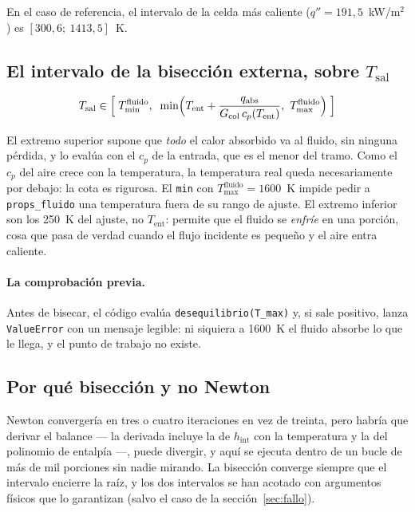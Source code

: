 \documentclass[11pt,a4paper]{article}
\begin{document}
En el caso de referencia, el intervalo de la celda más caliente
($q'' = 191{,}5$~kW/m$^2$) es $[300{,}6;\ 1413{,}5]$~K.

\subsection{El intervalo de la bisección externa, sobre $T_{\mathrm{sal}}$}

\[
  T_{\mathrm{sal}} \in \Bigl[\;T_{\min}^{\mathrm{fluido}},\;\;
  \min\Bigl(T_{\mathrm{ent}} + \frac{q_{\mathrm{abs}}}{G_{\mathrm{col}}\,c_p(T_{\mathrm{ent}})},\ T_{\max}^{\mathrm{fluido}}\Bigr)\;\Bigr]
\]

El extremo superior supone que \emph{todo} el calor absorbido va al fluido, sin
ninguna pérdida, y lo evalúa con el $c_p$ de la entrada, que es el menor del
tramo. Como el $c_p$ del aire crece con la temperatura, la temperatura real
queda necesariamente por debajo: la cota es rigurosa. El \texttt{min} con
$T_{\max}^{\mathrm{fluido}} = 1600$~K impide pedir a \texttt{props\_fluido} una
temperatura fuera de su rango de ajuste. El extremo inferior son los 250~K del
ajuste, no $T_{\mathrm{ent}}$: permite que el fluido se \emph{enfríe} en una
porción, cosa que pasa de verdad cuando el flujo incidente es pequeño y el aire
entra caliente.

\paragraph{La comprobación previa.} Antes de bisecar, el código evalúa
\texttt{desequilibrio(T\_max)} y, si sale positivo, lanza \texttt{ValueError}
con un mensaje legible: ni siquiera a 1600~K el fluido absorbe lo que le llega,
y el punto de trabajo no existe.

\subsection{Por qué bisección y no Newton}

Newton convergería en tres o cuatro iteraciones en vez de treinta, pero habría
que derivar el balance --- la derivada incluye la de $h_{\mathrm{int}}$ con la
temperatura y la del polinomio de entalpía ---, puede divergir, y aquí se ejecuta
dentro de un bucle de más de mil porciones sin nadie mirando. La bisección
converge siempre que el intervalo encierre la raíz, y los dos intervalos se han
acotado con argumentos físicos que lo garantizan (salvo el caso de la
sección~\ref{sec:fallo}).
\end{document}
